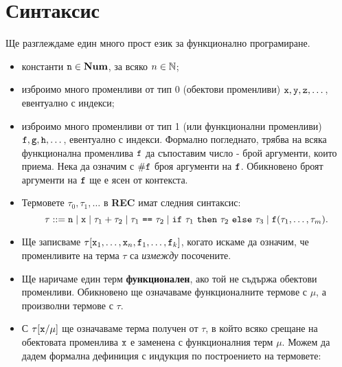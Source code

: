 \section{Синтаксис}
Ще разглеждаме един много прост език за функционално програмиране.
\begin{itemize}
\item
  константи $\texttt{n}\in\mathbf{Num}$, за всяко $n \in \mathbb{N}$;
\item
  изброимо много променливи от тип 0 (обектови променливи) $\texttt{x}, \texttt{y}, \texttt{z}, \dots$, евентуално с индекси;
\item
  изброимо много променливи от тип 1 (или функционални променливи) $\texttt{f},\texttt{g},\texttt{h},\dots$, евентуално с индекси. 
  Формално погледнато, трябва на всяка функционална променлива $\texttt{f}$
  да съпоставим число - брой аргументи, които приема. Нека да означим с $\#\texttt{f}$ броя аргументи на $\texttt{f}$.
  Обикновено броят аргументи на $\texttt{f}$ ще е ясен от контекста.
\item
  Термовете $\tau_0,\tau_1,\dots$ в {\bf REC} имат следния синтаксис:
  \[\tau ::= \texttt{n} \mid \texttt{x} \mid \tau_1 + \tau_2 \mid \tau_1\ \texttt{==}\ \tau_2 \mid \texttt{if}\ \tau_1\ \texttt{then}\ \tau_2\ \texttt{else}\ \tau_3 \mid \texttt{f}(\tau_1,\dots,\tau_{m}).\]
\item
  Ще записваме $\tau[\texttt{x}_1,\dots,\texttt{x}_n,\texttt{f}_1,\dots,\texttt{f}_k]$, когато искаме да означим, че променливите
  на терма $\tau$ са {\em измежду} посочените.
\item
  Ще наричаме един терм {\bf функционален}, ако той не съдържа обектови променливи.
  Обикновено ще означаваме функционалните термове с $\mu$, а произволни термове с $\tau$.
\item
  С $\tau[\texttt{x}/\mu]$ ще означаваме терма получен от $\tau$, в който всяко срещане на обектовата променлива $\texttt{x}$
  е заменена с функционалния терм $\mu$. Можем да дадем формална дефиниция с индукция по построението на термовете:
  \begin{itemize}

\end{itemize}
\end{itemize}

